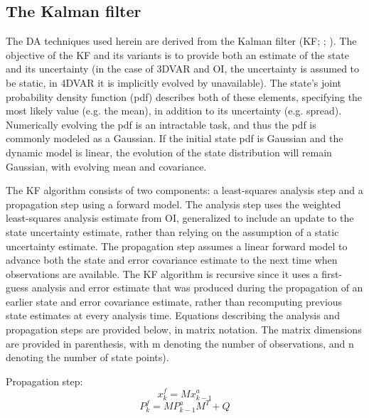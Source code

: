 \subsection{The Kalman filter}
The DA techniques used herein are derived from the Kalman filter (KF; \citealt{kalman60}; \citealt{kalmanbucy61}). The objective of the KF and its variants is to provide both an estimate of the state and its uncertainty (in the case of 3DVAR and OI, the uncertainty is assumed to be static, in 4DVAR it is implicitly evolved by unavailable). The state’s joint probability density function (pdf) describes both of these elements, specifying the most likely value (e.g. the mean), in addition to its uncertainty (e.g. spread). Numerically evolving the pdf is an intractable task, and thus the pdf is commonly modeled as a Gaussian. If the initial state pdf is Gaussian and the dynamic model is linear, the evolution of the state distribution will remain Gaussian, with evolving mean and covariance.

The KF algorithm consists of two components: a least-squares analysis step and a propagation step using a forward model. The analysis step uses the weighted least-squares analysis estimate from OI, generalized to include an update to the state uncertainty estimate, rather than relying on the assumption of a static uncertainty estimate. The propagation step assumes a linear forward model to advance both the state and error covariance estimate to the next time when observations are available. The KF algorithm is recursive since it uses a first-guess analysis and error estimate that was produced during the propagation of an earlier state and error covariance estimate, rather than recomputing previous state estimates at every analysis time. Equations describing the analysis and propagation steps are provided below, in matrix notation. The matrix dimensions are provided in parenthesis, with m denoting the number of observations, and n denoting the number of state points).

\noindent Propagation step:
\begin{equation}
   x_k^f = Mx_{k-1}^a
\label{OI1}
\end{equation}
\begin{equation}
\label{coveqn1}
   P_k^f = MP_{k-1}^{a}M^T + Q
\end{equation}

